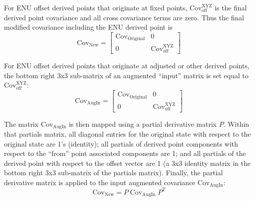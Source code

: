 For ENU offset derived points that originate at fixed points, $\text{Cov}_{\text{off}}^{\text{XYZ}}$ is the final derived point covariance and all cross covariance terms are zero. Thus the final modified covariance including the ENU derived point is
\begin{equation}
\text{Cov}_{\text{New}} = \left[ \begin{array}{cc} 
\text{Cov}_{\text{Original}} & 0 \\ 0 & \text{Cov}_{\text{off}}^{\text{XYZ}}
\end{array} \right]
\end{equation}

For ENU offset derived points that originate at adjusted or other derived points, the bottom right 3x3 sub-matrix of an augmented ``input'' matrix is set equal to $\text{Cov}_{\text{off}}^{\text{XYZ}}$:
\begin{equation}
\text{Cov}_{\text{AugIn}} = \left[ \begin{array}{cc} 
\text{Cov}_{\text{Original}} & 0 \\ 0 & \text{Cov}_{\text{off}}^{\text{XYZ}}
\end{array} \right]
\end{equation}

The matrix $\text{Cov}_{\text{AugIn}}$ is then mapped using a partial derivative matrix $P$.  Within that partials matrix, all diagonal entries for the original state with respect to the original state are 1's (identity); all partials of derived point components with respect to the ``from'' point associated components are 1; and all partials of the derived point with respect to the offset vector are 1 (a 3x3 identity matrix in the bottom right 3x3 sub-matrix of the partials matrix).  Finally, the partial derivative matrix is applied to the input augmented covariance $\text{Cov}_{\text{AugIn}}$:
\begin{equation}\label{eq:CovMapping2}
\text{Cov}_{\text{New}} = P \; \text{Cov}_{\text{AugIn}} \; P^T
\end{equation}
